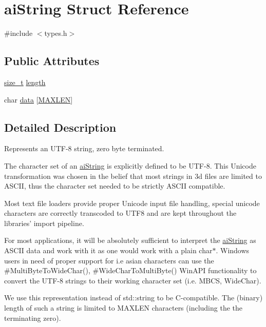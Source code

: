 \hypertarget{structai_string}{\section{ai\-String Struct Reference}
\label{structai_string}
}


{\ttfamily \#include $<$types.\-h$>$}

\subsection*{Public Attributes}
\begin{DoxyCompactItemize}
\item 
\hyperlink{_s_d_l__config_8h_a7c94ea6f8948649f8d181ae55911eeaf}{size\-\_\-t} \hyperlink{structai_string_a7d77c2031ff0340746aa046f7fbcf313}{length}
\item 
char \hyperlink{structai_string_aa90b1da7d347a3dcca0a95061e6ea41d}{data} \mbox{[}\hyperlink{types_8h_ae6648cd71a8bd49d58ae8ed33ba910d1}{M\-A\-X\-L\-E\-N}\mbox{]}
\end{DoxyCompactItemize}


\subsection{Detailed Description}
Represents an U\-T\-F-\/8 string, zero byte terminated.

The character set of an \hyperlink{structai_string}{ai\-String} is explicitly defined to be U\-T\-F-\/8. This Unicode transformation was chosen in the belief that most strings in 3d files are limited to A\-S\-C\-I\-I, thus the character set needed to be strictly A\-S\-C\-I\-I compatible.

Most text file loaders provide proper Unicode input file handling, special unicode characters are correctly transcoded to U\-T\-F8 and are kept throughout the libraries' import pipeline.

For most applications, it will be absolutely sufficient to interpret the \hyperlink{structai_string}{ai\-String} as A\-S\-C\-I\-I data and work with it as one would work with a plain char$\ast$. Windows users in need of proper support for i.\-e asian characters can use the \#\-Multi\-Byte\-To\-Wide\-Char(), \#\-Wide\-Char\-To\-Multi\-Byte() Win\-A\-P\-I functionality to convert the U\-T\-F-\/8 strings to their working character set (i.\-e. M\-B\-C\-S, Wide\-Char).

We use this representation instead of std\-::string to be C-\/compatible. The (binary) length of such a string is limited to M\-A\-X\-L\-E\-N characters (including the the terminating zero). 

